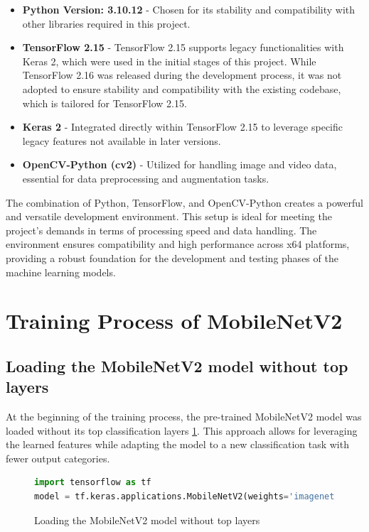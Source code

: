 \begin{itemize}
\item \textbf{Python Version: 3.10.12} - Chosen for its stability and compatibility with other libraries required in this project.
\item \textbf{TensorFlow 2.15} - TensorFlow 2.15 supports legacy functionalities with Keras 2, which were used in the initial stages of this project. While TensorFlow 2.16 was released during the development process, it was not adopted to ensure stability and compatibility with the existing codebase, which is tailored for TensorFlow 2.15.
\item \textbf{Keras 2} - Integrated directly within TensorFlow 2.15 to leverage specific legacy features not available in later versions.
\item \textbf{OpenCV-Python (cv2)} - Utilized for handling image and video data, essential for data preprocessing and augmentation tasks.
\end{itemize}

The combination of Python, TensorFlow, and OpenCV-Python creates a powerful and versatile development environment. This setup is ideal for meeting the project's demands in terms of processing speed and data handling. The environment ensures compatibility and high performance across x64 platforms, providing a robust foundation for the development and testing phases of the machine learning models.

\section{Training Process of MobileNetV2}

\subsection{Loading the MobileNetV2 model without top layers}
At the beginning of the training process, the pre-trained MobileNetV2 model was loaded without its top classification layers \ref{code:mobilenet_loading}. This approach allows for leveraging the learned features while adapting the model to a new classification task with fewer output categories.

\begin{figure}[H]
\begin{lstlisting}[language=Python]
import tensorflow as tf
model = tf.keras.applications.MobileNetV2(weights='imagenet', include_top=False, input_shape=(224, 224, 3))
\end{lstlisting}
\caption{Loading the MobileNetV2 model without top layers}
\label{code:mobilenet_loading}
\end{figure}

